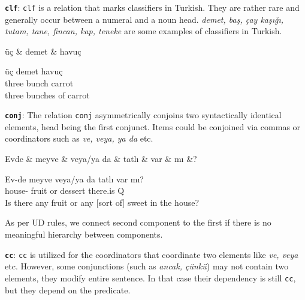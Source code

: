 \documentclass[11pt,a4paper]{article}
\begin{document}
\textbf{\texttt{clf}}:
\texttt{clf} is a relation that marks classifiers in Turkish. They are rather rare and generally occur between a numeral and a noun head. \textit{demet, baş, çay kaşığı, tutam, tane, fincan, kap, teneke} are some examples of classifiers in Turkish.

\begin{exe}
\ex \label{clf}
\begin{dependency}
\begin{deptext}
üç \& demet \& havuç \\
\end{deptext}
\end{dependency}
\gll üç demet havuç \\
three bunch carrot \\
\glt three bunches of carrot
\end{exe}

\textbf{\texttt{conj}}:
The relation \texttt{conj} asymmetrically conjoins two syntactically identical elements, head being the first conjunct. Items could be conjoined via commas or coordinators such as \textit{ve, veya, ya da} etc. 

\begin{exe}
\ex \label{conj}
\begin{dependency}
\begin{deptext}[column sep=0.32cm]
Evde \& meyve \& veya/ya da \& tatlı \& var \& mı \&? \\
\end{deptext}
\end{dependency}
\gll Ev-de meyve veya/ya da tatlı var mı? \\
house-\Loc{} fruit or dessert there.is Q \\
\glt Is there any fruit or any [sort of] sweet in the house?
\end{exe}

As per UD rules, we connect second component to the first if there is no meaningful hierarchy between components.

\textbf{\texttt{cc}}:
\texttt{cc} is utilized for the coordinators that coordinate two elements like \textit{ve, veya} etc. However, some conjunctions (such as \textit{ancak, çünkü}) may not contain two elements, they modify entire sentence. In that case their dependency is still \texttt{cc}, but they depend on the predicate.
\end{document}
